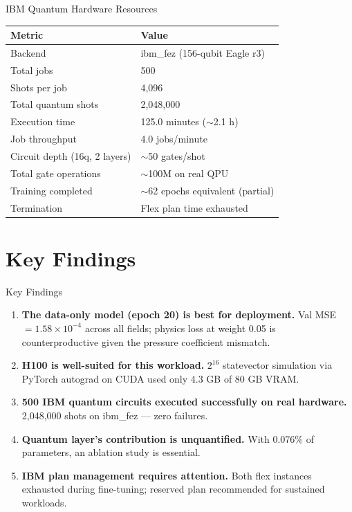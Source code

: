 \documentclass[aspectratio=169]{beamer}
\begin{document}
\begin{frame}{IBM Quantum Hardware Resources}
\begin{table}
\centering
\small
\begin{tabular}{ll}
\toprule
Metric & Value \\
\midrule
Backend & ibm\_fez (156-qubit Eagle r3) \\
Total jobs & 500 \\
Shots per job & 4,096 \\
Total quantum shots & 2,048,000 \\
Execution time & 125.0 minutes ($\sim$2.1 h) \\
Job throughput & 4.0 jobs/minute \\
Circuit depth (16q, 2 layers) & $\sim$50 gates/shot \\
Total gate operations & $\sim$100M on real QPU \\
Training completed & $\sim$62 epochs equivalent (partial) \\
Termination & Flex plan time exhausted \\
\bottomrule
\end{tabular}
\end{table}
\end{frame}

\section{Key Findings}

\begin{frame}{Key Findings}
\begin{enumerate}
  \item \textbf{The data-only model (epoch 20) is best for deployment.} Val MSE $=1.58\times10^{-4}$ across all fields; physics loss at weight 0.05 is counterproductive given the pressure coefficient mismatch.
  \item \textbf{H100 is well-suited for this workload.} $2^{16}$ statevector simulation via PyTorch autograd on CUDA used only 4.3 GB of 80 GB VRAM.
  \item \textbf{500 IBM quantum circuits executed successfully on real hardware.} 2,048,000 shots on ibm\_fez --- zero failures.
  \item \textbf{Quantum layer's contribution is unquantified.} With 0.076\% of parameters, an ablation study is essential.
  \item \textbf{IBM plan management requires attention.} Both flex instances exhausted during fine-tuning; reserved plan recommended for sustained workloads.
\end{enumerate}
\end{frame}
\end{document}

